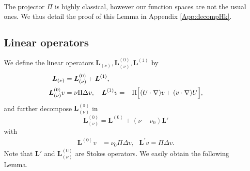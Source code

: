 \documentclass[11pt]{article}
\begin{document}
The projector $\Pi$ is highly classical, however our function spaces are not the usual ones.
We thus detail the proof of this Lemma in Appendix \ref{App:decompHk}.




\subsection{Linear operators\label{sect: lin operators}}




We define the linear operators $\boldsymbol{L}_{(\nu )},\boldsymbol{L}^{(0)}_{(\nu )},%
\boldsymbol{L}^{(1)}$ by
\begin{align*}
\boldsymbol{L}_{(\nu )} &=\boldsymbol{L}_{(\nu )}^{(0)}+\boldsymbol{L}^{(1)}, \\
\boldsymbol{L}_{(\nu)}^{(0)}v &=\nu \Pi \Delta v, \quad
\boldsymbol{L}^{(1)}v =-\Pi \Bigl[ (U\cdot \nabla )v+(v\cdot \nabla )U \Bigr], 
\end{align*}
and further decompose $\boldsymbol{L}_{(\nu)}^{(0)}$ in 
$$
\boldsymbol{L}_{(\nu )}^{(0)} =\boldsymbol{L}^{(0)}+(\nu-\nu_0)\boldsymbol{L}'
$$
with
\begin{align*}
\boldsymbol{L}^{(0)}v &=\nu _{0}\Pi \Delta v,\text{ }\boldsymbol{L}^{\prime }v=\Pi \Delta v.
\end{align*}
Note that $\boldsymbol{L}'$ and
$\boldsymbol{L}^{(0)}_{(\nu)}$ are Stokes operators.
We easily obtain the following Lemma.
\end{document}
